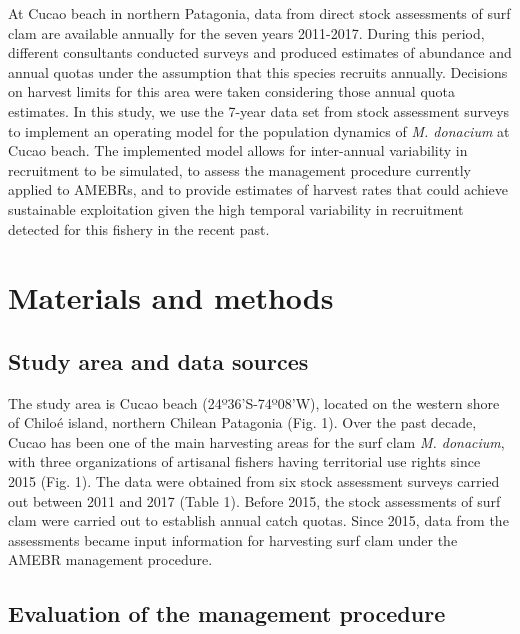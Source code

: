 \documentclass[12pt]{article}
\begin{document}
At Cucao beach in northern Patagonia, data from direct stock assessments
of surf clam are available annually for the seven years 2011-2017.
During this period, different consultants conducted surveys and produced
estimates of abundance and annual quotas under the assumption that this
species recruits annually. Decisions on harvest limits for this area
were taken considering those annual quota estimates. In this study, we
use the 7-year data set from stock assessment surveys to implement an
operating model for the population dynamics of \emph{M. donacium} at
Cucao beach. The implemented model allows for inter-annual variability
in recruitment to be simulated, to assess the management procedure
currently applied to AMEBRs, and to provide estimates of harvest rates
that could achieve sustainable exploitation given the high temporal
variability in recruitment detected for this fishery in the recent past.

\FloatBarrier

\hypertarget{materials-and-methods}{%
\section{Materials and methods}\label{materials-and-methods}}

\hypertarget{study-area-and-data-sources}{%
\subsection{Study area and data
sources}\label{study-area-and-data-sources}}

The study area is Cucao beach (24º36'S-74º08'W), located on the western
shore of Chiloé island, northern Chilean Patagonia (Fig. 1). Over the
past decade, Cucao has been one of the main harvesting areas for the
surf clam \emph{M. donacium}, with three organizations of artisanal
fishers having territorial use rights since 2015 (Fig. 1). The data were
obtained from six stock assessment surveys carried out between 2011 and
2017 (Table 1). Before 2015, the stock assessments of surf clam were
carried out to establish annual catch quotas. Since 2015, data from the
assessments became input information for harvesting surf clam under the
AMEBR management procedure.

\hypertarget{evaluation-of-the-management-procedure}{%
\subsection{Evaluation of the management
procedure}\label{evaluation-of-the-management-procedure}}
\end{document}

